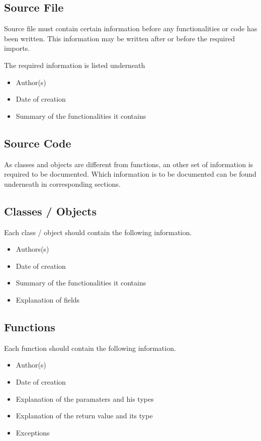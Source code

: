 \documentclass[12pt]{article}
\begin{document}
\subsection{Source File}\label{source-file}

Source file must contain certain information before any functionalities
or code has been written. This information may be written after or
before the required imports.

The required information is listed underneath

\begin{itemize}
\item
  Author(s)
\item
  Date of creation
\item
  Summary of the functionalities it contains
\end{itemize}

\subsection{Source Code}\label{source-code}

As classes and objects are different from functions, an other set of
information is required to be documented. Which information is to be
documented can be found underneath in corresponding sections.

\subsection{Classes / Objects}\label{classes-objects}

Each class / object should contain the following information.

\begin{itemize}
\item
  Authors(s)
\item
  Date of creation
\item
  Summary of the functionalities it contains
\item
  Explanation of fields
\end{itemize}

\subsection{Functions}\label{functions}

Each function should contain the following information.

\begin{itemize}
\item
  Author(s)
\item
  Date of creation
\item
  Explanation of the paramaters and his types
\item
  Explanation of the return value and its type
\item
  Exceptions
\end{itemize}
\end{document}
